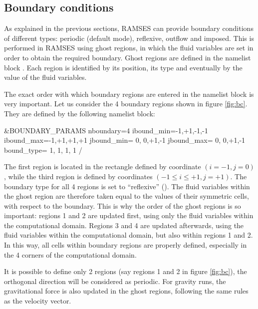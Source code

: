 \subsection{Boundary conditions}
\label{sec:bc}

As explained in the previous sections, RAMSES can provide boundary conditions
of different types: periodic (default mode), reflexive, outflow and imposed.
This is performed in RAMSES using ghost regions, in which the fluid variables
are set in order to obtain the required boundary. Ghost regions are defined in
the namelist block . Each region is identified by
its position, its type and eventually by the value of the fluid variables.

\begin{warning}
The exact order with which boundary regions are entered in the namelist block
is very important. Let us consider the 4 boundary regions shown in figure
\ref{fig:bc}. They are defined by the following namelist block:
%
\begin{Prompt}
&BOUNDARY_PARAMS
nboundary=4
ibound_min=-1,+1,-1,-1
ibound_max=-1,+1,+1,+1
jbound_min= 0, 0,+1,-1
jbound_max= 0, 0,+1,-1
bound_type= 1, 1, 1, 1
/
\end{Prompt}
%
The first region is located in the rectangle defined by coordinate
$(i=-1,j=0)$, while the third region is defined by coordinates $(-1 \leq i \leq
+1, j=+1)$. The boundary type for all 4 regions is set to ``reflexive''
(). The fluid variables within the ghost region
are therefore taken equal to the values of their symmetric cells, with respect
to the boundary. This is why the order of the ghost regions is so important:
regions 1 and 2 are updated first, using only the fluid variables within the
computational domain.  Regions 3 and 4 are updated afterwards, using the fluid
variables within the computational domain, but also within regions 1 and 2. In
this way, all cells within boundary regions are properly defined, especially in
the 4 corners of the computational domain.
\end{warning}

It is possible to define only 2 regions (say regions 1 and 2 in figure
\ref{fig:bc}), the orthogonal direction will be considered as periodic. For
gravity runs, the gravitational force is also updated in the ghost regions,
following the same rules as the velocity vector.


